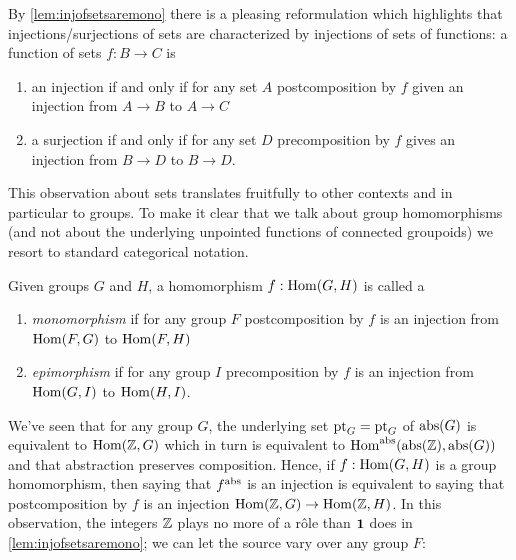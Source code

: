 

By \cref{lem:injofsetsaremono} there is a pleasing reformulation which highlights that injections/surjections of sets are characterized by injections of sets of functions: a function of sets $f:B\to C$ is
\begin{enumerate}
\item  an injection if and only if for any set $A$ postcomposition by $f$ given an injection from $A\to B$ to $A\to C$
\item a surjection if and only if for any set $D$ precomposition by $f$ gives an injection from $B\to D$ to $B\to D$.
\end{enumerate}

This observation about sets translates fruitfully to other contexts and in particular to groups.  To make it clear that we talk about group homomorphisms (and not about the underlying unpointed functions of connected groupoids) we resort to standard categorical notation.
\begin{definition}\label{def:monomorphism}\label{def:epimorphism}
Given groups $G$ and $H$, a homomorphism $f: \mathrm{Hom}(G,H)$ is called a
\begin{enumerate}
\item \emph{monomorphism} if for any group $F$  postcomposition by $f$ is an injection from $\mathrm{Hom}(F,G)$ to $\mathrm{Hom}(F,H)$
\item \emph{epimorphism} if for any group $I$  precomposition by $f$ is an injection from $\mathrm{Hom}(G,I)$ to $\mathrm{Hom}(H,I)$.
\end{enumerate}
\end{definition}

We've seen that for any group $G$, the underlying set $\mathrm{pt}_G=\mathrm{pt}_G$ of $\mathrm{abs}(G)$ is equivalent to $\mathrm{Hom}(\mathbb{Z},G)$ which in turn is equivalent to $\mathrm{Hom}^{\mathrm{abs}}(\mathrm{abs}(\mathbb{Z}),\mathrm{abs}(G))$ and that abstraction preserves composition.  Hence, if $f:\mathrm{Hom}(G,H)$ is a group homomorphism, then saying that
$f^{\mathrm{abs}}$ is an injection is equivalent to saying that postcomposition by $f$ is an injection $\mathrm{Hom}(\mathbb{Z},G)\to\mathrm{Hom}(\mathbb{Z},H)$.
In this observation, the integers $\mathbb{Z}$ plays no more of a r\^ole than $\mathbf{1}$ does in \cref{lem:injofsetsaremono}; we can let the source vary over any group $F$: 

